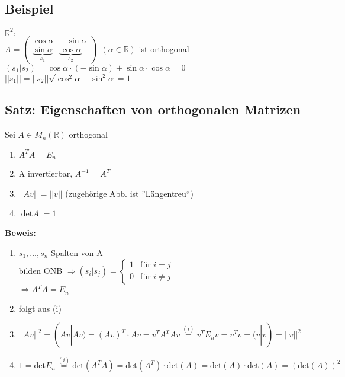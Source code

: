 \subsection{Beispiel}
$\mathbb{R}^2:$\\
$A=\begin{pmatrix}\cos \alpha & -\sin \alpha\\ \underbrace{\sin \alpha}_{s_1} & \underbrace{\cos \alpha}_{s_2}\end{pmatrix} \ \ (\alpha\in\mathbb{R})$ ist orthogonal\\
$(s_1|s_2)=\cos \alpha\cdot (-\sin \alpha) + \sin \alpha\cdot \cos\alpha = 0$\\
$||s_1|| = ||s_2||\sqrt{\cos^2 \alpha + \sin^2 \alpha}=1$


\subsection{Satz: Eigenschaften von orthogonalen Matrizen}
Sei $A\in M_n(\mathbb{R})$ orthogonal
\begin{enumerate}
\item $A^TA=E_n$
\item A invertierbar, $A^{-1}=A^T$
\item $||Av||=||v||$ (zugehörige Abb. ist ''Längentreu``)
\item $|\mathrm{det}A|=1$
\end{enumerate}
\textbf{Beweis:}
\begin{enumerate}
\item $s_1,\dots,s_n$ Spalten von A\\
bilden ONB $\Rightarrow (s_i|s_j)=\left\lbrace\begin{array}{ll}
1 & \text{für } i=j\\
0 & \text{für } i\neq j
\end{array}\right.$\\
$\Rightarrow A^TA=E_n$

\item
folgt aus (i)

\item
$||Av||^2 = (Av|Av) = (Av)^T\cdot Av = v^TA^TAv \stackrel{(i)}{=} v^TE_nv = v^Tv = (v|v) = ||v||^2$

\item
$1=\mathrm{det}E_n \stackrel{(i)}{=} \mathrm{det}(A^TA) = \mathrm{det}(A^T)\cdot \mathrm{det}(A) = \mathrm{det}(A)\cdot \mathrm{det}(A) = (\mathrm{det}(A))^2$
\end{enumerate}